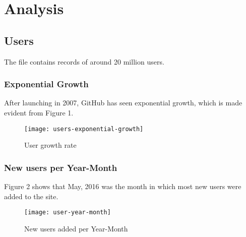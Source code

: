 \newpage

\section{Analysis}

\subsection{Users}

The  file contains records of around 20 million users.

\subsubsection{Exponential Growth}

After launching in 2007, GitHub has seen exponential growth, which is made evident from Figure 1.

\begin{figure}[htb]
\centering
\texttt{[image: users-exponential-growth]}
\caption{User growth rate}
\end{figure}


\subsubsection{New users per Year-Month}

Figure 2 shows that May, 2016 was the month in which most new users were added to the site.

\begin{figure}[htb]
\centering
\texttt{[image: user-year-month]}
\caption{New users added per Year-Month}
\end{figure}

